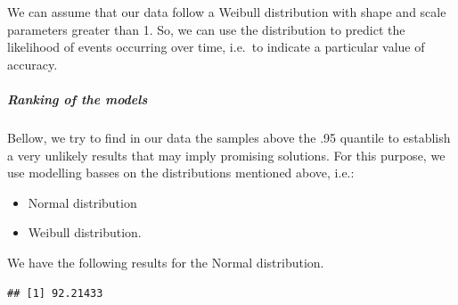 \documentclass[
]{article}
\newenvironment{Shaded}{\begin{snugshade}}{\end{snugshade}}
\newcommand{\CommentTok}[1]{\textcolor[rgb]{0.56,0.35,0.01}{\textit{#1}}}
\newcommand{\DecValTok}[1]{\textcolor[rgb]{0.00,0.00,0.81}{#1}}
\newcommand{\FunctionTok}[1]{\textcolor[rgb]{0.00,0.00,0.00}{#1}}
\newcommand{\NormalTok}[1]{#1}
\newcommand{\OtherTok}[1]{\textcolor[rgb]{0.56,0.35,0.01}{#1}}
\newcommand{\SpecialCharTok}[1]{\textcolor[rgb]{0.00,0.00,0.00}{#1}}
\newcommand{\StringTok}[1]{\textcolor[rgb]{0.31,0.60,0.02}{#1}}
\providecommand{\tightlist}{%
  \setlength{\itemsep}{0pt}\setlength{\parskip}{0pt}}
\begin{document}
We can assume that our data follow a Weibull distribution with shape and scale parameters greater than 1. So, we can use the distribution to predict the likelihood of events occurring over time, i.e.~to indicate a particular value of accuracy.

\hypertarget{ranking-of-the-models}{%
\subparagraph{Ranking of the models}\label{ranking-of-the-models}}

Bellow, we try to find in our data the samples above the .95 quantile to establish a very unlikely results that may imply promising solutions. For this purpose, we use modelling basses on the distributions mentioned above, i.e.:

\begin{itemize}
\tightlist
\item
  Normal distribution
\item
  Weibull distribution.
\end{itemize}

We have the following results for the Normal distribution.

\begin{Shaded}
\end{Shaded}

\begin{verbatim}
## [1] 92.21433
\end{verbatim}
\end{document}
